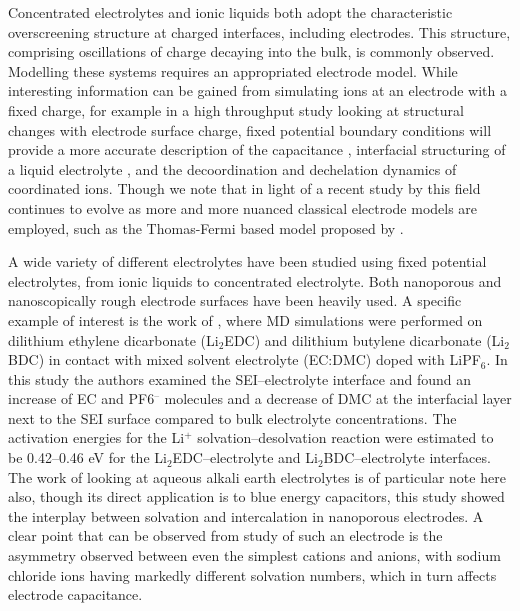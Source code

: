 \documentclass[../main.tex]{subfiles}
\begin{document}
Concentrated electrolytes and ionic liquids both adopt the characteristic overscreening structure at charged interfaces, including electrodes. This structure, comprising oscillations of charge decaying into the bulk, is commonly observed\cite{coles_nanostructure_2017,merlet_simulating_2013}. Modelling these systems requires an appropriated electrode model. While interesting information can be gained from simulating ions at an electrode with a fixed charge, for example in a high throughput study looking at structural changes with electrode surface charge\cite{coles_nanostructure_2017}, fixed potential boundary conditions will provide a more accurate description of the capacitance \cite{merlet_simulating_2013, scalfi_semiclassical_2020}, interfacial structuring of a liquid electrolyte \cite{coles_simulation_2019, vatamanu_ramifications_2017, li_capacitive_2018}, and the decoordination and dechelation dynamics of coordinated ions\cite{vatamanu_molecular_2009}. Though we note that in light of a recent study by \citeauthor{scalfi_semiclassical_2020} this field continues to evolve as more and more nuanced classical electrode models are employed, such as the Thomas-Fermi based model proposed by \citeauthor{scalfi_semiclassical_2020} \cite{scalfi_semiclassical_2020}.

A wide variety of different electrolytes have been studied using fixed potential electrolytes, from ionic liquids to concentrated electrolyte. Both nanoporous \cite{merlet_highly_2013, merlet_molecular_2012, vatamanu_molecular_2009, vatamanu_ramifications_2017} and nanoscopically rough electrode surfaces have been heavily used\cite{vatamanu_influence_2011}. A specific example of interest is the work of \citeauthor{borodin_interfacial_2014}, where MD simulations were performed on dilithium ethylene dicarbonate (Li$_2$EDC) and dilithium butylene dicarbonate (Li$_2$BDC) in contact with mixed solvent electrolyte (EC:DMC) doped with LiPF$_6$. \cite{borodin_interfacial_2014} In this study the authors examined the SEI–electrolyte interface and found an increase of EC and PF6$^{–}$ molecules and a decrease of DMC at the interfacial layer next to the SEI surface compared to bulk electrolyte concentrations. The activation energies for the Li$^{+}$ solvation–desolvation reaction were estimated to be 0.42--0.46 eV for the Li$_2$EDC–electrolyte and Li$_2$BDC–electrolyte interfaces. The work of \citeauthor{Simoncelli_2018} looking at aqueous alkali earth electrolytes is of particular note here also, though its direct application is to blue energy capacitors, this study showed the interplay between solvation and intercalation in nanoporous electrodes. A clear point that can be observed from study of such an electrode is the asymmetry observed between even the simplest cations and anions, with sodium chloride ions having markedly different solvation numbers, which in turn affects electrode capacitance\cite{Simoncelli_2018}.
    
\end{document}
